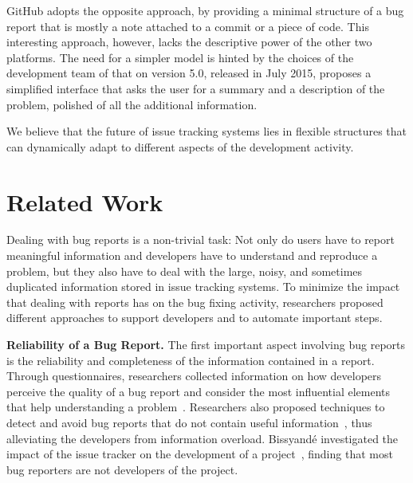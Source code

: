 GitHub adopts the opposite approach, by providing a minimal structure of a bug report that is mostly a note attached to a commit or a piece of code. This interesting approach, however, lacks the descriptive power of the other two platforms. The need for a simpler model is hinted by the choices of the development team of \bzilla that on version 5.0, released in July 2015, proposes a simplified interface that asks the user for a summary and a description of the problem, polished of all the additional information. 

We believe that the future of issue tracking systems lies in flexible structures that can dynamically adapt to different aspects of the development activity.


\section{Related Work} \label{sec:related}

Dealing with bug reports is a non-trivial task: Not only do users have to report meaningful information and developers have to understand and reproduce a problem, but they also have to deal with the large, noisy, and sometimes duplicated  information stored in issue tracking systems. To minimize the impact that dealing with reports has on the bug fixing activity, researchers proposed different approaches to support developers and to automate important steps.

\textbf{Reliability of a Bug Report.} The first important aspect involving bug reports is the reliability and completeness of the information contained in a report. Through questionnaires, researchers collected information on how developers perceive the quality of a bug report and consider the most influential elements that help understanding a problem~\cite{Zimm2010,Bett2007,Schr2010}. Researchers also proposed techniques to detect and avoid bug reports that do not contain useful information~\cite{Sun2011}, thus alleviating the developers from information overload. Bissyand\'e \etal investigated the impact of the issue tracker on the development of a project~\cite{Biss2013}, finding that most bug reporters are not developers of the project.

